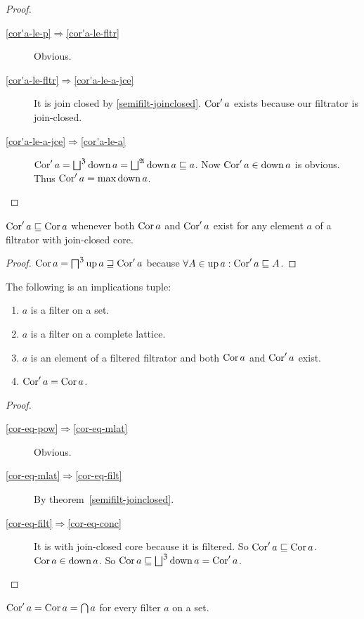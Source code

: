 \begin{proof}
~
\begin{description}
\item [{\ref{cor'a-le-p}$\Rightarrow$\ref{cor'a-le-fltr}}] Obvious.
\item [{\ref{cor'a-le-fltr}$\Rightarrow$\ref{cor'a-le-a-jce}}] It is
join closed by \ref{semifilt-joinclosed}. $\operatorname{Cor}'a$ exists because
our filtrator is join-closed.
\item [{\ref{cor'a-le-a-jce}$\Rightarrow$\ref{cor'a-le-a}}] $\Cor'a=\bigsqcup^{\mathfrak{Z}}\down a=\bigsqcup^{\mathfrak{A}}\down a\sqsubseteq a$.
Now $\operatorname{Cor}'a\in\operatorname{down} a$ is obvious. Thus $\operatorname{Cor}'a=\max\operatorname{down} a$.
\end{description}
\end{proof}
\begin{prop}
$\operatorname{Cor}'a\sqsubseteq\operatorname{Cor} a$ whenever both $\operatorname{Cor} a$ and $\operatorname{Cor}'a$ exist
for any element $a$ of a filtrator with join-closed core.\end{prop}
\begin{proof}
$\operatorname{Cor} a=\bigsqcap^{\mathfrak{Z}}\operatorname{up} a\sqsupseteq\operatorname{Cor}'a$ because $\forall A\in\operatorname{up} a:\operatorname{Cor}'a\sqsubseteq A$.\end{proof}
\begin{thm}
\label{cor-eq}The following is an implications tuple:
\begin{enumerate}
\item \label{cor-eq-pow}$a$ is a filter on a set.
\item \label{cor-eq-mlat}$a$ is a filter on a complete lattice.
\item \label{cor-eq-filt}$a$ is an element of a filtered filtrator and
both $\operatorname{Cor} a$ and $\operatorname{Cor}'a$ exist.
\item \label{cor-eq-conc}$\operatorname{Cor}'a=\operatorname{Cor} a$.
\end{enumerate}
\end{thm}
\begin{proof}
~
\begin{description}
\item [{\ref{cor-eq-pow}$\Rightarrow$\ref{cor-eq-mlat}}] Obvious.
\item [{\ref{cor-eq-mlat}$\Rightarrow$\ref{cor-eq-filt}}] By theorem~\ref{semifilt-joinclosed}.
\item [{\ref{cor-eq-filt}$\Rightarrow$\ref{cor-eq-conc}}] It is with
join-closed core because it is filtered. So $\operatorname{Cor}'a\sqsubseteq\operatorname{Cor} a$.
$\operatorname{Cor} a\in\operatorname{down} a$. So $\Cor a\sqsubseteq\bigsqcup^{\mathfrak{Z}}\down a=\Cor'a$.
\end{description}
\end{proof}
\begin{cor}
\label{dcor-eq-cor}$\operatorname{Cor}'a=\operatorname{Cor} a=\bigcap a$ for every filter $a$
on a set.
\end{cor}

